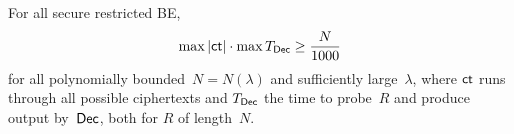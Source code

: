 \begin{theorem}\label{thm:lower-bound}
For all secure restricted BE,
\begin{align*}
\max{|\ct|}\cdot\max{\TDec}\geq\frac{N}{1000}
\end{align*}
for all polynomially bounded~${N=N(\lambda)}$ and sufficiently large~$\lambda$,
where $\ct$ runs through all possible ciphertexts and
$\TDec$ the time to probe~$R$ and produce output by~$\Dec$,
both for $R$ of length~$N$.
\end{theorem}
